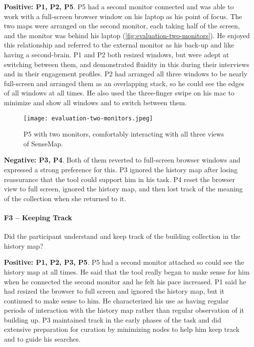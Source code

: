 \textbf{Positive: P1, P2, P5}. P5 had a second monitor connected and was able to work with a full-screen browser window on his laptop as his point of focus. The two maps were arranged on the second monitor, each taking half of the screen, and the monitor was behind his laptop (\autoref{fig:evaluation-two-monitors}). He enjoyed this relationship and referred to the external monitor as his back-up and like having a second-brain. P1 and P2 both resized windows, but were adept at switching between them, and demonstrated fluidity in this during their interviews and in their engagement profiles. P2 had arranged all three windows to be nearly full-screen and arranged them as an overlapping stack, so he could see the edges of all windows at all times. He also used the three-finger swipe on his mac to minimize and show all windows and to switch between them.

\begin{figure}[!htb]
	\centering
	\texttt{[image: evaluation-two-monitors.jpeg]}
	\caption{P5 with two monitors, comfortably interacting with all three views of SenseMap.}
	\label{fig:evaluation-two-monitors}
\end{figure}

\textbf{Negative: P3, P4}. Both of them reverted to full-screen browser windows and expressed a strong preference for this. P3 ignored the history map after losing reassurance that the tool could support him in his task. P4 reset the browser view to full screen, ignored the history map, and then lost track of the meaning of the collection when she returned to it.

\paragraph{F3 -- Keeping Track}
Did the participant understand and keep track of the building collection in the history map?

\textbf{Positive: P1, P2, P3, P5}. P5 had a second monitor attached so could see the history map at all times. He said that the tool really began to make sense for him when he connected the second monitor and he felt his pace increased. P1 said he had resized the browser to full screen and ignored the history map, but it continued to make sense to him. He characterized his use as having regular periods of interaction with the history map rather than regular observation of it building up. P3 maintained track in the early phases of the task and did extensive preparation for curation by minimizing nodes to help him keep track and to guide his searches.

